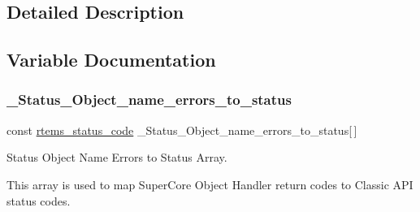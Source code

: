 \subsection{Detailed Description}


\subsection{Variable Documentation}
\mbox{\label{group__ClassicStatusImpl_gaefbdceb4ff8e9f3fe7e0439a87f1b882}} 
\subsubsection{\texorpdfstring{\_Status\_Object\_name\_errors\_to\_status}{\_Status\_Object\_name\_errors\_to\_status}}
{\footnotesize\ttfamily const \mbox{\hyperlink{group__ClassicStatus_ga545d41846817eaba6143d52ee4d9e9fe}{rtems\+\_\+status\+\_\+code}} \+\_\+\+Status\+\_\+\+Object\+\_\+name\+\_\+errors\+\_\+to\+\_\+status\mbox{[}$\,$\mbox{]}}



Status Object Name Errors to Status Array. 

This array is used to map Super\+Core Object Handler return codes to Classic A\+PI status codes. 